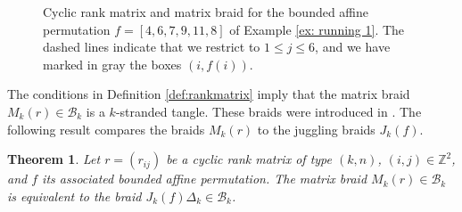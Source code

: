 \documentclass[10pt]{amsart}
\theoremstyle{plain}
\newtheorem{thm}{Theorem}[section]
\theoremstyle{definition}
\theoremstyle{remark}
\numberwithin{equation}{section}
\newcommand{\Z}{\mathbb{Z}}
\newcommand{\cB}{\mathcal{B}}
\newcommand{\JS}[1]{{\color{cyan}{{\bf Jos\'e}: #1}}}
\newcommand{\MG}[1]{{\color{teal}{{\bf Misha}: #1}}}
\begin{document}
\begin{figure}[h]
\begin{tikzpicture}[scale=0.6]
		\end{tikzpicture}
	\caption{Cyclic rank matrix and matrix braid for the bounded affine permutation $f = [4, 6, 7, 9, 11, 8]$ of Example \ref{ex: running 1}. The dashed lines indicate that we restrict to $1 \leq j \leq 6$, and we have marked in gray the boxes $(i, f(i))$. 
    }
    \label{fig: rank matrix}
	\end{figure}

\noindent The conditions in Definition \ref{def:rankmatrix} imply that the matrix braid $M_k(r)\in\cB_k$ is a $k$-stranded tangle. These braids were introduced in \cite[Section 3.2]{STWZ}. The following result compares the braids $M_k(r)$ to the juggling braids $J_k(f)$.

\begin{thm}
	\label{thm: STZW}
	Let $r=(r_{ij})$ be a cyclic rank matrix of type $(k,n)$, $(i,j)\in\Z^2$, and $f$ its associated bounded affine permutation. The matrix braid $M_k(r)\in\cB_k$ is equivalent to the braid $J_k(f)\Delta_k \in\cB_k$.
\end{thm}
\end{document}
